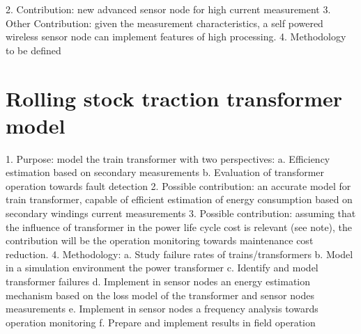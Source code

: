 2.	Contribution: new advanced sensor node for high current measurement
3.	Other Contribution: given the measurement characteristics, a self powered wireless sensor node can implement features of high processing.
4.	Methodology to be defined

\section{Rolling stock traction transformer model}


1.	Purpose: model the train transformer with two perspectives:
a.	Efficiency estimation based on secondary measurements
b.	Evaluation of transformer operation towards fault detection
2.	Possible contribution: an accurate model for train transformer, capable of efficient estimation of energy consumption based on secondary windings current measurements
3.	Possible contribution: assuming that the influence of transformer in the power life cycle cost is relevant (see note), the contribution will be the operation monitoring towards maintenance cost reduction.
4.	Methodology:
a.	Study failure rates of trains/transformers
b.	Model in a simulation environment the power transformer
c.	Identify and model transformer failures
d.	Implement in sensor nodes an energy estimation mechanism based on the loss model of the transformer and sensor nodes measurements
e.	Implement in sensor nodes a frequency analysis towards operation monitoring
f.	Prepare and implement results in field operation
